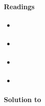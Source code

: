 \paragraph{Readings}
\begin{itemize}
\item \textcite[App. C]{Lutkepohl_2005_NewIntroductionMultiple}
\item \textcite[App. C]{Neusser_2016_TimeSeriesEconometrics}
\item \textcite{Ploberger_2010_LawLargeNumbers}
\item \textcite[Ch. 3]{White_2001_AsymptoticTheoryEconometricians}
\end{itemize}

\begin{solution}\textbf{Solution to }
\ifDisplaySolutions%

\fi
\newpage
\end{solution}